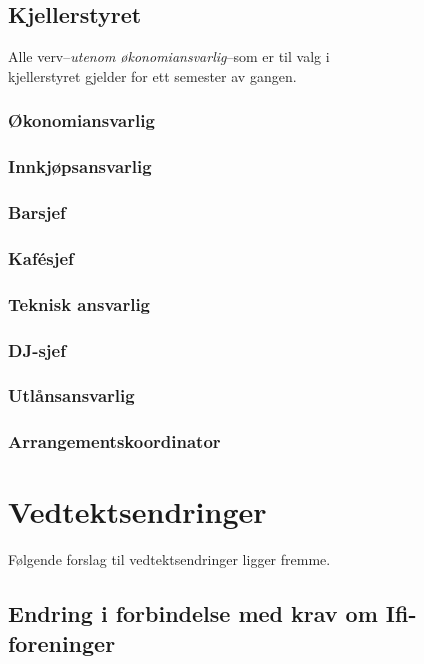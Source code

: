 \documentclass[10pt,norsk,a4paper]{article}
\begin{document}
\begin{minipage}[t]{9cm}
\subsection{Kjellerstyret}
Alle verv--\textit{utenom økonomiansvarlig}--som er til valg i \\kjellerstyret gjelder for ett semester av gangen.

\subsubsection{Økonomiansvarlig}
\subsubsection{Innkjøpsansvarlig}
\subsubsection{Barsjef}
\subsubsection{Kafésjef}
\subsubsection{Teknisk ansvarlig}
\subsubsection{DJ-sjef}
\subsubsection{Utlånsansvarlig}
\subsubsection{Arrangementskoordinator\footnotemark}

\end{minipage}

\newpage

\section{Vedtektsendringer}
Følgende forslag til vedtektsendringer ligger fremme.

\subsection{Endring i forbindelse med krav om Ifi-foreninger}
\end{document}
